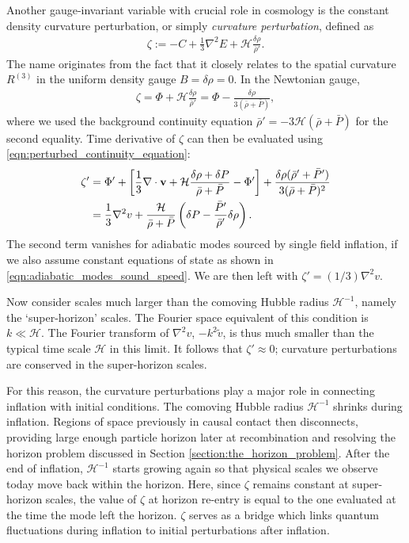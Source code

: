 Another gauge-invariant variable with crucial role in cosmology is the constant density curvature perturbation, or simply \textit{curvature perturbation}, defined as
\begin{align}
	\zeta := - C + \frac{1}{3} \nabla^2 E + \mathcal{H} \frac{\delta\rho}{\bar{\rho}'}.
\end{align}
The name originates from the fact that it closely relates to the spatial curvature $R^{(3)}$ in the uniform density gauge $B=\delta\rho=0$. In the Newtonian gauge,
\begin{align}
	\zeta = \Phi + \mathcal{H}\frac{\delta\rho}{\bar{\rho}'} = \Phi - \frac{\delta\rho}{3(\bar{\rho}+\bar{P})},
\end{align}
where we used the background continuity equation $\bar{\rho}'=-3\mathcal{H}(\bar{\rho}+\bar{P})$ for the second equality. Time derivative of $\zeta$ can then be evaluated using \eqref{eqn:perturbed_continuity_equation}:
\begin{align}
	\zeta' &= \Phi' + \left[ \frac{1}{3}\nabla\cdot\mathbf{v} + \mathcal{H}\frac{\delta\rho + \delta P}{\bar{\rho} + \bar{P}} - \Phi' \right] + \frac{\delta\rho (\bar{\rho}' + \bar{P}')}{3(\bar{\rho}+\bar{P})^2} \\
	&= \frac{1}{3}\nabla^2 v + \frac{\mathcal{H}}{\bar{\rho} + \bar{P}} \left( \delta P - \frac{\bar{P}'}{\bar{\rho}'} \delta\rho \right).
\end{align}
The second term vanishes for adiabatic modes sourced by single field inflation, if we also assume constant equations of state as shown in \eqref{eqn:adiabatic_modes_sound_speed}. We are then left with $\zeta' = (1/3) \nabla^2 v$.

Now consider scales much larger than the comoving Hubble radius $\mathcal{H}^{-1}$, namely the `super-horizon' scales. The Fourier space equivalent of this condition is $k \ll \mathcal{H}$. The Fourier transform of $\nabla^2 v$, $-k^2 \tilde{v}$, is thus much smaller than the typical time scale $\mathcal{H}$ in this limit. It follows that $\zeta'\approx 0$; curvature perturbations are conserved in the super-horizon scales.

For this reason, the curvature perturbations play a major role in connecting inflation with initial conditions. The comoving Hubble radius $\mathcal{H}^{-1}$ shrinks during inflation. Regions of space previously in causal contact then disconnects, providing large enough particle horizon later at recombination and resolving the horizon problem discussed in Section \ref{section:the_horizon_problem}. After the end of inflation, $\mathcal{H}^{-1}$ starts growing again so that physical scales we observe today move back within the horizon. Here, since $\zeta$ remains constant at super-horizon scales, the value of $\zeta$ at horizon re-entry is equal to the one evaluated at the time the mode left the horizon. $\zeta$ serves as a bridge which links quantum fluctuations during inflation to initial perturbations after inflation.



